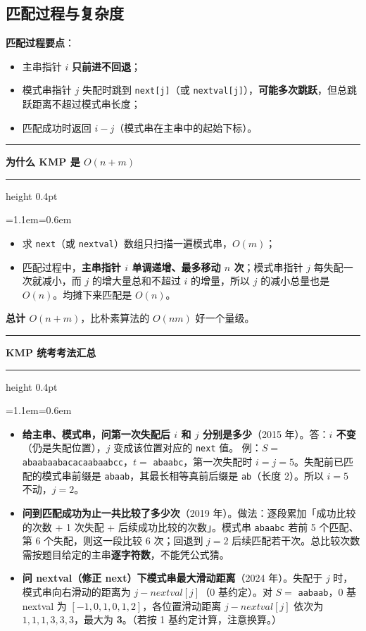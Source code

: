 \documentclass[11pt,openany,UTF8]{ctexbook}
\newcommand{\callouthead}[2]{%
  \par\addvspace{7pt}\noindent
  {\color{#1}\rule[-0.15em]{3pt}{1.05em}}\hspace{0.5em}%
  {\bfseries\color{#1}#2}\par\nobreak\vspace{-0.35em}%
  {\color{rulesep}\hrule height 0.4pt}\nobreak\vspace{0.45em}%
  \begingroup\small\setlength{\parindent}{0pt}%
  \leftskip=1.1em\rightskip=0.6em\noindent\ignorespaces}
\newcommand{\calloutend}{\par\endgroup\addvspace{7pt}}
\newenvironment{callkey}[1]{\callouthead{keybar}{#1}}{\calloutend}
\newenvironment{callexam}[1]{\callouthead{exambar}{#1}}{\calloutend}
\begin{document}
\subsection{匹配过程与复杂度}

\textbf{匹配过程要点}：

\begin{itemize}
\item 主串指针 $i$ \textbf{只前进不回退}；
\item 模式串指针 $j$ 失配时跳到 \texttt{next[j]\allowbreak{}}（或 \texttt{nextval[j]\allowbreak{}}），\textbf{可能多次跳跃}，但总跳跃距离不超过模式串长度；
\item 匹配成功时返回 $i-j$（模式串在主串中的起始下标）。
\end{itemize}
\begin{callkey}{为什么 KMP 是 $O(n+m)$}
\begin{itemize}
\item 求 \texttt{next}（或 \texttt{nextval}）数组只扫描一遍模式串，$O(m)$；
\item 匹配过程中，\textbf{主串指针 $i$ 单调递增、最多移动 $n$ 次}；模式串指针 $j$ 每失配一次就减小，而 $j$ 的增大量总和不超过 $i$ 的增量，所以 $j$ 的减小总量也是 $O(n)$。均摊下来匹配是 $O(n)$。
\end{itemize}
\textbf{总计 $O(n+m)$}，比朴素算法的 $O(nm)$ 好一个量级。

\end{callkey}

\begin{callexam}{KMP 统考考法汇总}
\begin{itemize}
\item \textbf{给主串、模式串，问第一次失配后 $i$ 和 $j$ 分别是多少}（2015 年）。答：\textbf{$i$ 不变}（仍是失配位置），$j$ 变成该位置对应的 \texttt{next} 值。 例：$S=$ \texttt{abaabaabacacaabaabcc}，$t=$ \texttt{abaabc}，第一次失配时 $i=j=5$。失配前已匹配的模式串前缀是 \texttt{abaab}，其最长相等真前后缀是 \texttt{ab}（长度 2）。所以 $i=5$ 不动，$j=2$。
\item \textbf{问到匹配成功为止一共比较了多少次}（2019 年）。做法：逐段累加「成功比较的次数 + 1 次失配 + 后续成功比较的次数」。模式串 \texttt{abaabc} 若前 5 个匹配、第 6 个失配，则这一段比较 6 次；回退到 $j=2$ 后续匹配若干次。总比较次数需按题目给定的主串\textbf{逐字符数}，不能凭公式猜。
\item \textbf{问 nextval（修正 next）下模式串最大滑动距离}（2024 年）。失配于 $j$ 时，模式串向右滑动的距离为 $j - nextval[j]$（0 基约定）。对 $S=$ \texttt{aabaab}，0 基 nextval 为 $[-1,0,1,0,1,2]$，各位置滑动距离 $j-nextval[j]$ 依次为 $1,1,1,3,3,3$，最大为 \textbf{3}。（若按 1 基约定计算，注意换算。）
\end{itemize}
\end{callexam}
\end{document}
